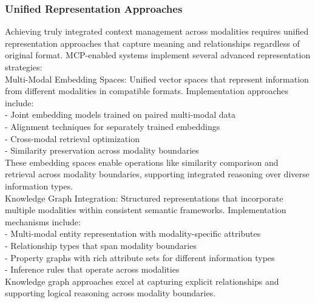 \subsubsection{Unified Representation Approaches}
Achieving truly integrated context management across modalities requires unified representation approaches that capture meaning and relationships regardless of original format. MCP-enabled systems implement several advanced representation strategies:\\ \newline
Multi-Modal Embedding Spaces: Unified vector spaces that represent information from different modalities in compatible formats. Implementation approaches include:\\ \newline
- Joint embedding models trained on paired multi-modal data\\ \newline
- Alignment techniques for separately trained embeddings\\ \newline
- Cross-modal retrieval optimization\\ \newline
- Similarity preservation across modality boundaries\\ \newline
These embedding spaces enable operations like similarity comparison and retrieval across modality boundaries, supporting integrated reasoning over diverse information types.\\ \newline
Knowledge Graph Integration: Structured representations that incorporate multiple modalities within consistent semantic frameworks. Implementation mechanisms include:\\ \newline
- Multi-modal entity representation with modality-specific attributes\\ \newline
- Relationship types that span modality boundaries\\ \newline
- Property graphs with rich attribute sets for different information types\\ \newline
- Inference rules that operate across modalities\\ \newline
Knowledge graph approaches excel at capturing explicit relationships and supporting logical reasoning across modality boundaries.\\ \newline
